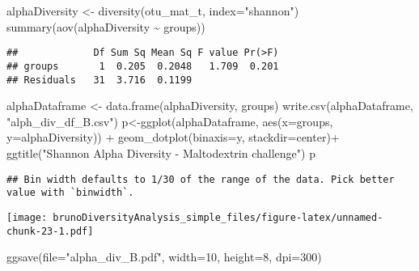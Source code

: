 \documentclass[
]{article}
\newenvironment{Shaded}{\begin{snugshade}}{\end{snugshade}}
\newcommand{\AttributeTok}[1]{\textcolor[rgb]{0.77,0.63,0.00}{#1}}
\newcommand{\DecValTok}[1]{\textcolor[rgb]{0.00,0.00,0.81}{#1}}
\newcommand{\FunctionTok}[1]{\textcolor[rgb]{0.00,0.00,0.00}{#1}}
\newcommand{\NormalTok}[1]{#1}
\newcommand{\OtherTok}[1]{\textcolor[rgb]{0.56,0.35,0.01}{#1}}
\newcommand{\SpecialCharTok}[1]{\textcolor[rgb]{0.00,0.00,0.00}{#1}}
\newcommand{\StringTok}[1]{\textcolor[rgb]{0.31,0.60,0.02}{#1}}
\begin{document}
\begin{Shaded}
\begin{Highlighting}[]
\NormalTok{alphaDiversity }\OtherTok{\textless{}{-}} \FunctionTok{diversity}\NormalTok{(otu\_mat\_t, }\AttributeTok{index=}\StringTok{"shannon"}\NormalTok{)}
\FunctionTok{summary}\NormalTok{(}\FunctionTok{aov}\NormalTok{(alphaDiversity }\SpecialCharTok{\textasciitilde{}}\NormalTok{ groups))}
\end{Highlighting}
\end{Shaded}

\begin{verbatim}
##             Df Sum Sq Mean Sq F value Pr(>F)
## groups       1  0.205  0.2048   1.709  0.201
## Residuals   31  3.716  0.1199
\end{verbatim}

\begin{Shaded}
\begin{Highlighting}[]
\NormalTok{alphaDataframe }\OtherTok{\textless{}{-}} \FunctionTok{data.frame}\NormalTok{(alphaDiversity, groups)}
\FunctionTok{write.csv}\NormalTok{(alphaDataframe, }\StringTok{"alph\_div\_df\_B.csv"}\NormalTok{)}
\NormalTok{p}\OtherTok{\textless{}{-}}\FunctionTok{ggplot}\NormalTok{(alphaDataframe, }\FunctionTok{aes}\NormalTok{(}\AttributeTok{x=}\NormalTok{groups, }\AttributeTok{y=}\NormalTok{alphaDiversity)) }\SpecialCharTok{+} 
  \FunctionTok{geom\_dotplot}\NormalTok{(}\AttributeTok{binaxis=}\StringTok{\textquotesingle{}y\textquotesingle{}}\NormalTok{, }\AttributeTok{stackdir=}\StringTok{\textquotesingle{}center\textquotesingle{}}\NormalTok{)}\SpecialCharTok{+}
  \FunctionTok{ggtitle}\NormalTok{(}\StringTok{"Shannon Alpha Diversity {-} Maltodextrin challenge"}\NormalTok{)}
\NormalTok{p}
\end{Highlighting}
\end{Shaded}

\begin{verbatim}
## Bin width defaults to 1/30 of the range of the data. Pick better value with `binwidth`.
\end{verbatim}

\texttt{[image: brunoDiversityAnalysis\_simple\_files/figure-latex/unnamed-chunk-23-1.pdf]}

\begin{Shaded}
\begin{Highlighting}[]
\FunctionTok{ggsave}\NormalTok{(}\AttributeTok{file=}\StringTok{"alpha\_div\_B.pdf"}\NormalTok{, }\AttributeTok{width=}\DecValTok{10}\NormalTok{, }\AttributeTok{height=}\DecValTok{8}\NormalTok{, }\AttributeTok{dpi=}\DecValTok{300}\NormalTok{)}
\end{Highlighting}
\end{Shaded}
\end{document}
